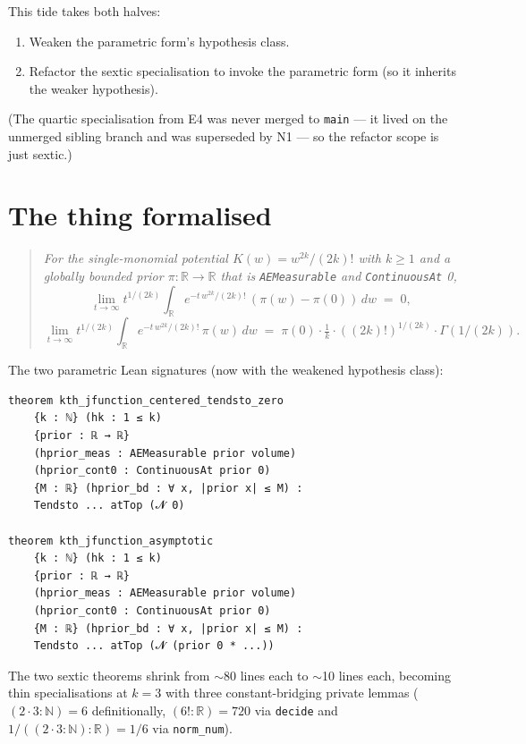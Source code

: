 \documentclass[11pt]{article}
\begin{document}
This tide takes both halves:

\begin{enumerate}
\item Weaken the parametric form's hypothesis class.
\item Refactor the sextic specialisation to invoke the parametric
  form (so it inherits the weaker hypothesis).
\end{enumerate}

(The quartic specialisation from E4 was never merged to \texttt{main}
--- it lived on the unmerged sibling branch and was superseded by N1
--- so the refactor scope is just sextic.)

\section{The thing formalised}

\begin{quote}\itshape
For the single-monomial potential $K(w) = w^{2k}/(2k)!$ with $k \ge 1$
and a globally bounded prior $\pi : \mathbb R \to \mathbb R$ that is
\texttt{AEMeasurable} and \texttt{ContinuousAt} 0,
\[
  \lim_{t \to \infty} t^{1/(2k)} \int_{\mathbb R}
    e^{-t\,w^{2k}/(2k)!}\,(\pi(w) - \pi(0))\,dw \;=\; 0,
\]
\[
  \lim_{t \to \infty} t^{1/(2k)} \int_{\mathbb R}
    e^{-t\,w^{2k}/(2k)!}\,\pi(w)\,dw \;=\;
    \pi(0) \cdot \tfrac{1}{k} \cdot ((2k)!)^{1/(2k)} \cdot \Gamma(1/(2k)).
\]
\end{quote}

\noindent The two parametric Lean signatures (now with the weakened
hypothesis class):
\begin{verbatim}
theorem kth_jfunction_centered_tendsto_zero
    {k : ℕ} (hk : 1 ≤ k)
    {prior : ℝ → ℝ}
    (hprior_meas : AEMeasurable prior volume)
    (hprior_cont0 : ContinuousAt prior 0)
    {M : ℝ} (hprior_bd : ∀ x, |prior x| ≤ M) :
    Tendsto ... atTop (𝓝 0)

theorem kth_jfunction_asymptotic
    {k : ℕ} (hk : 1 ≤ k)
    {prior : ℝ → ℝ}
    (hprior_meas : AEMeasurable prior volume)
    (hprior_cont0 : ContinuousAt prior 0)
    {M : ℝ} (hprior_bd : ∀ x, |prior x| ≤ M) :
    Tendsto ... atTop (𝓝 (prior 0 * ...))
\end{verbatim}

The two sextic theorems shrink from $\sim$80 lines each to $\sim$10
lines each, becoming thin specialisations at $k = 3$ with three
constant-bridging private lemmas
($(2 \cdot 3 : \mathbb N) = 6$ definitionally,
$(6! : \mathbb R) = 720$ via \texttt{decide} and
$1/((2 \cdot 3 : \mathbb N) : \mathbb R) = 1/6$ via \texttt{norm\_num}).
\end{document}

